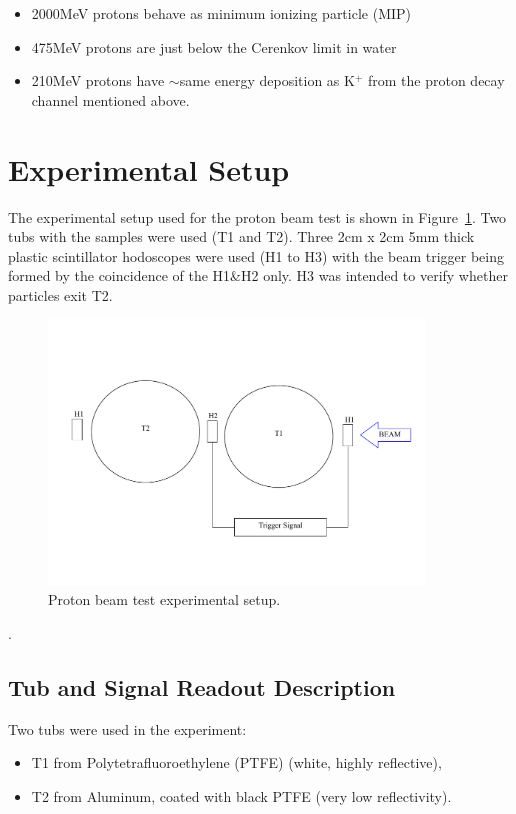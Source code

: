 \documentclass[preprint,12pt]{elsarticle}
\begin{document}
\begin{itemize}
	\item 2000MeV protons behave as minimum ionizing particle (MIP)
	\item 475MeV protons are just below the Cerenkov limit in water
	\item 210MeV protons have $\sim$same energy deposition as K$^{+}$ from the proton decay channel mentioned above.
\end{itemize}
 


 \section{Experimental Setup}
 \label{setup1}

The experimental setup used for the proton beam test is shown in Figure~\ref{experimentalsetup1}. Two tubs with the samples were used (T1 and T2). Three 2cm x 2cm 5mm thick plastic scintillator hodoscopes were used (H1 to H3) with the beam trigger being formed by the coincidence of the H1\&H2 only. H3 was intended to verify whether particles exit T2.
\begin{figure}[ht]
\centering
\includegraphics[width=100mm]{beamtestschematics1.pdf}
\caption{Proton beam test experimental setup.} \label{experimentalsetup1}
\end{figure}.





\subsection{Tub and Signal Readout Description}
\label{tubs}
Two tubs were used in the experiment:

\begin{itemize}
	\item T1 from Polytetrafluoroethylene (PTFE) (white, highly reflective),
  \item T2 from Aluminum, coated with black PTFE (very low reflectivity).
\end{itemize}
\end{document}
